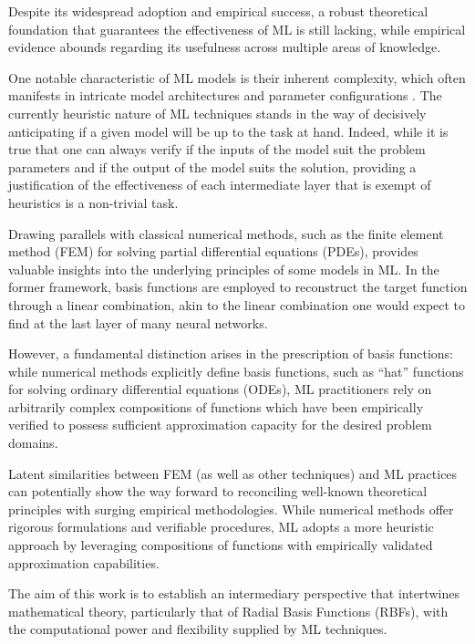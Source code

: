 \documentclass[12pt]{report} %
\begin{document}
Despite its widespread adoption and empirical success, a robust theoretical foundation that 
guarantees the effectiveness of ML is still lacking, while empirical evidence abounds 
regarding its usefulness across multiple areas of knowledge.

One notable characteristic of ML models is their inherent complexity, which often manifests 
in intricate model architectures and parameter configurations \cite{cuomo2022scientific}. 
The currently heuristic nature of ML techniques stands in the way of decisively 
anticipating if a given model will be up to the task at hand. 
Indeed, while it is true that one can always verify if the inputs of
the model suit the problem parameters and if the output of the model suits the solution,
providing a justification of the effectiveness of each intermediate layer that is
exempt of heuristics is a non-trivial task.

Drawing parallels with classical numerical methods, such as the finite element method (FEM) for 
solving partial differential equations (PDEs), provides valuable insights into the underlying 
principles of some models in ML. In the former framework, 
basis functions are employed to 
reconstruct the target function through a linear combination, akin to the linear combination 
one would expect to find at the last layer of many neural networks.

However, a fundamental distinction arises in the 
prescription of basis functions: while numerical methods explicitly define basis functions, 
such as ``hat'' functions for solving ordinary differential equations (ODEs), ML practitioners 
rely on arbitrarily complex compositions of functions which have been empirically verified 
to possess sufficient approximation capacity for the desired problem domains.

Latent similarities between FEM (as well as other techniques) and ML practices 
can potentially show the way forward to reconciling well-known theoretical principles with 
surging empirical methodologies. While numerical
 methods offer rigorous formulations and verifiable procedures, ML adopts a more heuristic
  approach by leveraging compositions of functions with empirically validated approximation 
  capabilities.

The aim of this work is to establish an intermediary perspective that intertwines
mathematical theory, particularly that of Radial Basis Functions (RBFs), with the
computational power and flexibility supplied by ML techniques. 
\end{document}
